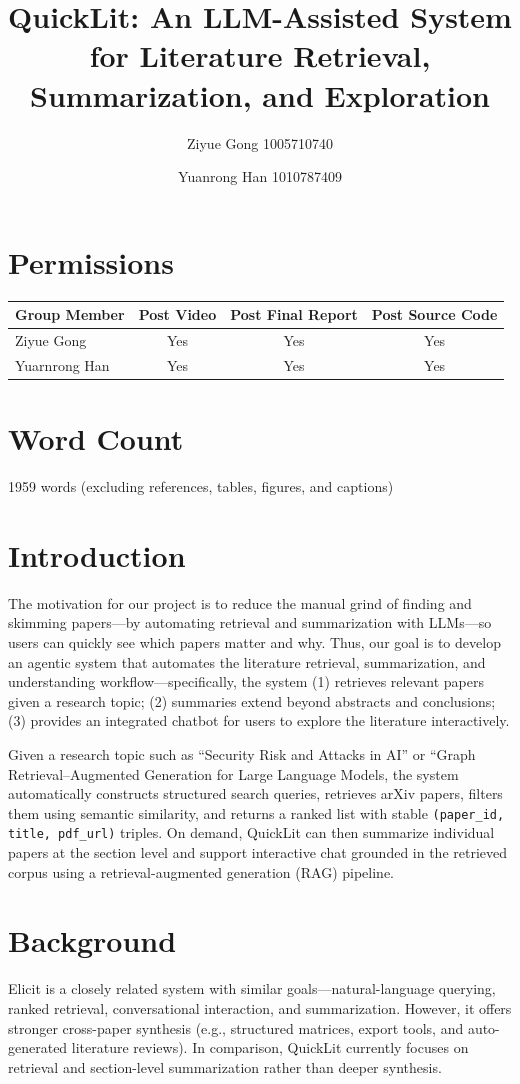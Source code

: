\documentclass{article}
\title{QuickLit: An LLM-Assisted System for Literature Retrieval, Summarization, and Exploration}
\author{Ziyue Gong 1005710740
\and Yuanrong Han 1010787409}
\begin{document}
\maketitle
\section*{Permissions}
\begin{tabular}{|l|c|c|c|}
\hline
\textbf{Group Member} & \textbf{Post Video} & \textbf{Post Final Report} & \textbf{Post Source Code} \\ \hline
Ziyue Gong       & Yes & Yes & Yes \\ \hline
Yuarnrong Han    & Yes & Yes & Yes \\ \hline
\end{tabular}

\section*{Word Count}
1959 words (excluding references, tables, figures, and captions)

\newpage
\section{Introduction}
The motivation for our project is to reduce the manual grind of finding and skimming papers—by automating retrieval and summarization with LLMs—so users can quickly see which papers matter and why.
Thus, our goal is to develop an agentic system that automates the literature retrieval, summarization, and understanding workflow—specifically, the system 
(1) retrieves relevant papers given a research topic; 
(2) summaries extend beyond abstracts and conclusions;
(3) provides an integrated chatbot for users to explore the literature interactively.

Given a research topic such as ``Security Risk and Attacks in AI'' or ``Graph Retrieval--Augmented Generation for Large Language Models, the system automatically constructs structured search queries, retrieves arXiv papers, filters them using semantic similarity, and returns a ranked list with stable \texttt{(paper\_id, title, pdf\_url)} triples.
On demand, QuickLit can then summarize individual papers at the section level and support interactive chat grounded in the retrieved corpus using a retrieval-augmented generation (RAG) pipeline.

\section{Background}
Elicit is a closely related system with similar goals—natural-language querying, ranked retrieval, conversational interaction, and summarization\cite{kung2023elicit}\cite{bernard2025elicit}. However, it offers stronger cross-paper synthesis (e.g., structured matrices, export tools, and auto-generated literature reviews). In comparison, QuickLit currently focuses on retrieval and section-level summarization rather than deeper synthesis.
\end{document}

